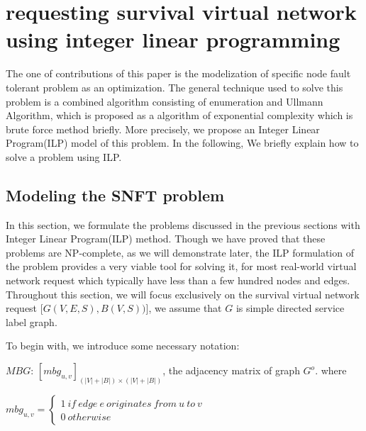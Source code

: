 
\section{requesting survival virtual network using integer linear programming}
\label{sec:SVN_ILP}
The one of contributions of this paper is the modelization of specific node fault tolerant problem as an optimization. The general technique used to solve this problem is a combined algorithm consisting of enumeration and Ullmann Algorithm\cite{ullmann1976algorithm}, which is proposed as a  algorithm of exponential complexity which is brute force method briefly. More precisely, we propose an Integer Linear Program(ILP)\cite{schrijver1998theory} model of this problem. In the following, We briefly explain how to solve a problem using ILP.

\subsection{Modeling the SNFT problem}
In this section, we formulate the problems discussed in the previous sections with Integer Linear Program(ILP) method. Though we have proved that these problems are NP-complete, as we will demonstrate later, the ILP formulation of the problem provides a very viable tool for solving it, for most real-world virtual network request which typically have less than a few hundred nodes and edges. Throughout this section, we will focus exclusively on the survival virtual network request [$G(V,E,S),B(V,S))$], we assume that $G$ is simple directed service label graph.


To begin with, we introduce some necessary notation:

$MBG$: $[mbg_{u,v}]_{(|V|+|B|)\times (|V|+|B|)}$, the adjacency matrix of graph $G^o$. where

${mbg_{u,v}}=\left\{ \begin{array}{l}
1\ if\ edge\ e\ originates\ from\ u\ to\ v\\
0\ otherwise
\end{array} \right.$ \\

